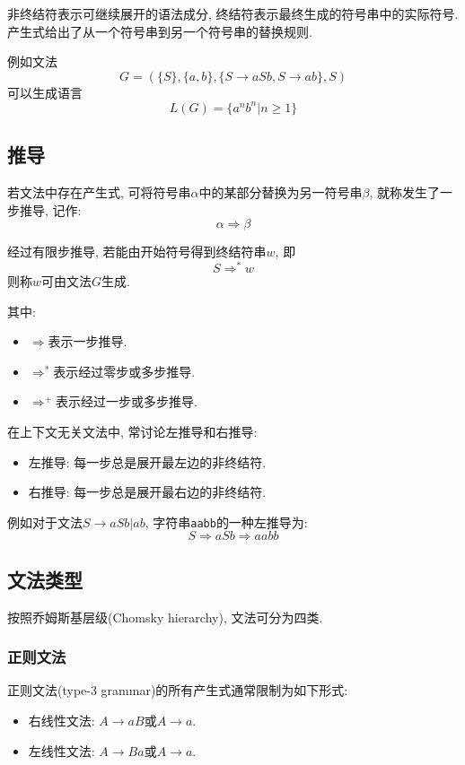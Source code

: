非终结符表示可继续展开的语法成分, 终结符表示最终生成的符号串中的实际符号.
产生式给出了从一个符号串到另一个符号串的替换规则.

例如文法
\[
G = (\{S\}, \{a,b\}, \{S \to a S b, S \to a b\}, S)
\]
可以生成语言
\[
L(G) = \{a^n b^n | n \ge 1\}
\]

\subsection{推导}


若文法中存在产生式, 可将符号串$\alpha$中的某部分替换为另一符号串$\beta$, 就称发生了一步推导, 记作:
\[
\alpha \Rightarrow \beta
\]

经过有限步推导, 若能由开始符号得到终结符串$w$, 即
\[
S \Rightarrow^{*} w
\]
则称$w$可由文法$G$生成.

其中:

\begin{itemize}
\item $\Rightarrow$表示一步推导.
\item $\Rightarrow^{*}$表示经过零步或多步推导.
\item $\Rightarrow^{+}$表示经过一步或多步推导.
\end{itemize}

在上下文无关文法中, 常讨论左推导和右推导:

\begin{itemize}
\item 左推导: 每一步总是展开最左边的非终结符.
\item 右推导: 每一步总是展开最右边的非终结符.
\end{itemize}

例如对于文法$S \to a S b | a b$, 字符串\texttt{aabb}的一种左推导为:
\[
S \Rightarrow a S b \Rightarrow a a b b
\]

\subsection{文法类型}


按照乔姆斯基层级(Chomsky hierarchy), 文法可分为四类.

\subsubsection{正则文法}


正则文法(type-3 grammar)的所有产生式通常限制为如下形式:

\begin{itemize}
\item 右线性文法: $A \to a B$或$A \to a$.
\item 左线性文法: $A \to B a$或$A \to a$.
\end{itemize}

